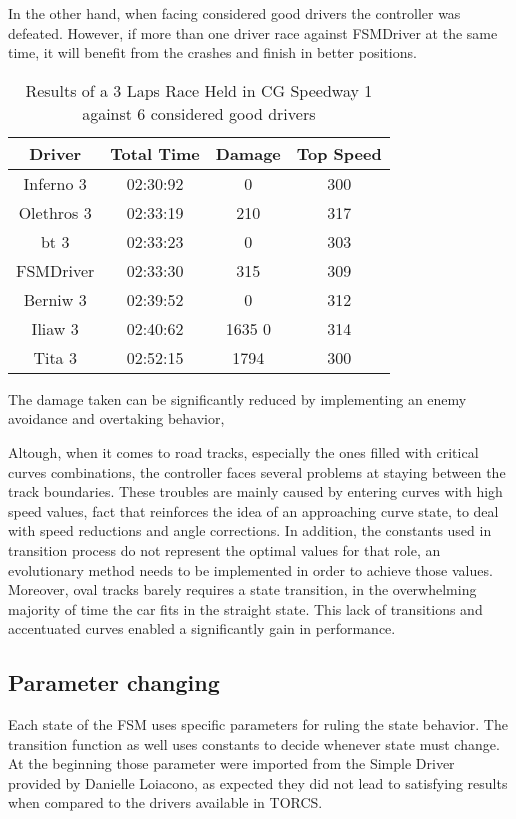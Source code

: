 In the other hand, when facing considered good drivers the controller was defeated. However, if more than one driver race against FSMDriver at the same time, it will benefit from the crashes and finish in better positions.

\begin{table}[h]
\renewcommand{\arraystretch}{1.3}
\caption{Results of a 3 Laps Race Held in CG Speedway 1 against 6 considered good drivers}
\label{table_4}
\centering
\begin{tabular}{c||c||c||c}
\hline  \bfseries Driver & \bfseries Total Time & \bfseries  Damage & \bfseries Top Speed \\ 
\hline Inferno 3 & 02:30:92 & 0 & 300 \\ 
\hline Olethros 3 & 02:33:19 & 210 & 317 \\  
\hline bt 3 & 02:33:23 & 0 & 303 \\  
\hline FSMDriver & 02:33:30 & 315 & 309 \\  
\hline Berniw 3 & 02:39:52 & 0 & 312 \\
\hline Iliaw 3 & 02:40:62 & 1635 0 & 314 \\
\hline Tita 3 & 02:52:15 & 1794 & 300 \\
\hline 
\end{tabular}
\end{table} 


The damage taken can be significantly reduced by implementing an enemy avoidance and overtaking behavior,

Altough, when it comes to road tracks, especially the ones filled with critical curves combinations, the controller faces several problems at staying between the track boundaries. These troubles are mainly caused by entering curves with high speed values, fact that reinforces the idea of an approaching curve state, to deal with speed reductions and angle corrections. In addition, the constants used in transition process do not represent the optimal values for that role, an evolutionary method needs to be implemented in order to achieve those values. Moreover, oval tracks barely requires a state transition, in the overwhelming majority of time the car fits in the straight state. This lack of transitions and accentuated curves enabled
a significantly gain in performance.

\subsection{Parameter changing}
Each state of the FSM uses specific parameters for ruling the state behavior. The transition function as well uses constants to decide whenever state must change. At the beginning those parameter were imported from the Simple Driver provided by Danielle Loiacono, as expected they did not lead to satisfying results when compared to the drivers available in TORCS.

